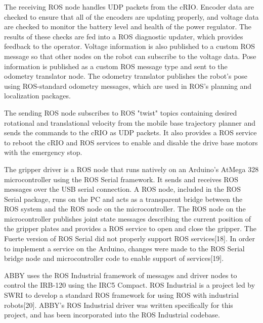 \documentclass[]{cwru} %
\begin{document}
The receiving ROS node handles UDP packets from the cRIO. Encoder data
are checked to ensure that all of the encoders are updating properly,
and voltage data are checked to monitor the battery level and health of
the power regulator. The results of these checks are fed into a ROS
diagnostic updater, which provides feedback to the operator. Voltage
information is also published to a custom ROS message so that other
nodes on the robot can subscribe to the voltage data. Pose information
is published as a custom ROS message type and sent to the odometry
translator node. The odometry translator publishes the robot's pose
using ROS-standard odometry messages, which are used in ROS's planning
and localization packages.

The sending ROS node subscribes to ROS "twist" topics containing desired
rotational and translational velocity from the mobile base trajectory
planner and sends the commands to the cRIO as UDP packets. It also
provides a ROS service to reboot the cRIO and ROS services to enable and
disable the drive base motors with the emergency stop.

The gripper driver is a ROS node that runs natively on an Arduino's
AtMega 328 microcontroller using the ROS Serial framework. It sends and
receives ROS messages over the USB serial connection. A ROS node,
included in the ROS Serial package, runs on the PC and acts as a
transparent bridge between the ROS system and the ROS node on the
microcontroller. The ROS node on the microcontroller publishes joint
state messages describing the current position of the gripper plates and
provides a ROS service to open and close the gripper. The Fuerte version
of ROS Serial did not properly support ROS services{[}18{]}. In order to
implement a service on the Arduino, changes were made to the ROS Serial
bridge node and microcontroller code to enable support of
services{[}19{]}.

ABBY uses the ROS Industrial framework of messages and driver nodes to
control the IRB-120 using the IRC5 Compact. ROS Industrial is a project
led by SWRI to develop a standard ROS framework for using ROS with
industrial robots{[}20{]}. ABBY's ROS Industrial driver was written
specifically for this project, and has been incorporated into the ROS
Industrial codebase.
\end{document}
